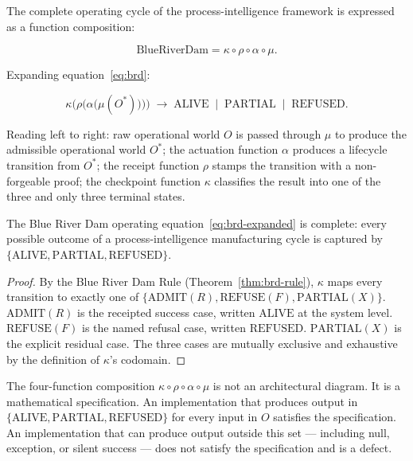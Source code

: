 The complete operating cycle of the process-intelligence framework is
expressed as a function composition:

\begin{equation}
\label{eq:brd}
  \mathrm{BlueRiverDam} = \kappa \circ \rho \circ \alpha \circ \mu.
\end{equation}

Expanding equation~\eqref{eq:brd}:

\begin{equation}
\label{eq:brd-expanded}
  \kappa\bigl(\rho\bigl(\alpha\bigl(\mu(O^*)\bigr)\bigr)\bigr)
  \;\to\; \mathrm{ALIVE} \;\mid\; \mathrm{PARTIAL} \;\mid\;
  \mathrm{REFUSED}.
\end{equation}

Reading left to right: raw operational world $O$ is passed through $\mu$ to
produce the admissible operational world $O^*$; the actuation function
$\alpha$ produces a lifecycle transition from $O^*$; the receipt function
$\rho$ stamps the transition with a non-forgeable proof; the checkpoint
function $\kappa$ classifies the result into one of the three and only three
terminal states.

\begin{theorem}
\label{thm:brd-completeness}
The Blue River Dam operating equation~\eqref{eq:brd-expanded} is complete:
every possible outcome of a process-intelligence manufacturing cycle is
captured by $\{\mathrm{ALIVE}, \mathrm{PARTIAL}, \mathrm{REFUSED}\}$.
\end{theorem}

\begin{proof}
By the Blue River Dam Rule (Theorem~\ref{thm:brd-rule}), $\kappa$ maps every
transition to exactly one of $\{\mathrm{ADMIT}(R), \mathrm{REFUSE}(F),
\mathrm{PARTIAL}(X)\}$. $\mathrm{ADMIT}(R)$ is the receipted success case,
written $\mathrm{ALIVE}$ at the system level. $\mathrm{REFUSE}(F)$ is the
named refusal case, written $\mathrm{REFUSED}$. $\mathrm{PARTIAL}(X)$ is the
explicit residual case. The three cases are mutually exclusive and exhaustive
by the definition of $\kappa$'s codomain.
\end{proof}

\begin{remark}
The four-function composition $\kappa \circ \rho \circ \alpha \circ \mu$ is
not an architectural diagram. It is a mathematical specification. An
implementation that produces output in $\{\mathrm{ALIVE}, \mathrm{PARTIAL},
\mathrm{REFUSED}\}$ for every input in $O$ satisfies the specification. An
implementation that can produce output outside this set --- including null,
exception, or silent success --- does not satisfy the specification and is a
defect.
\end{remark}


